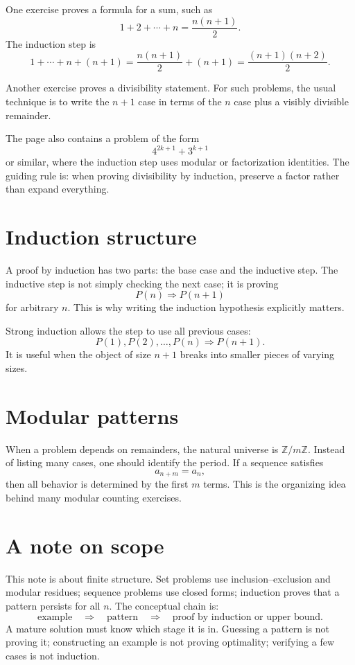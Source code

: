 One exercise proves a formula for a sum, such as
\[
  1+2+\cdots+n=\frac{n(n+1)}2.
\]
The induction step is
\[
  1+\cdots+n+(n+1)
  =\frac{n(n+1)}2+(n+1)
  =\frac{(n+1)(n+2)}2.
\]

Another exercise proves a divisibility statement.  For such problems, the usual technique is to write the \(n+1\) case in terms of the \(n\) case plus a visibly divisible remainder.

The page also contains a problem of the form
\[
  4^{2k+1}+3^{k+1}
\]
or similar, where the induction step uses modular or factorization identities.  The guiding rule is: when proving divisibility by induction, preserve a factor rather than expand everything.


\section{Induction structure}

A proof by induction has two parts: the base case and the inductive step.  The inductive step is not simply checking the next case; it is proving
\[
  P(n)\Rightarrow P(n+1)
\]
for arbitrary \(n\).  This is why writing the induction hypothesis explicitly matters.

Strong induction allows the step to use all previous cases:
\[
  P(1),P(2),\ldots,P(n)\Rightarrow P(n+1).
\]
It is useful when the object of size \(n+1\) breaks into smaller pieces of varying sizes.

\section{Modular patterns}

When a problem depends on remainders, the natural universe is \(\mathbb Z/m\mathbb Z\).  Instead of listing many cases, one should identify the period.  If a sequence satisfies
\[
  a_{n+m}=a_n,
\]
then all behavior is determined by the first \(m\) terms.  This is the organizing idea behind many modular counting exercises.

\section{A note on scope}

This note is about finite structure.  Set problems use inclusion--exclusion and modular residues; sequence problems use closed forms; induction proves that a pattern persists for all \(n\).  The conceptual chain is:
\[
  \text{example}\quad\Rightarrow\quad\text{pattern}\quad\Rightarrow\quad\text{proof by induction or upper bound}.
\]
A mature solution must know which stage it is in.  Guessing a pattern is not proving it; constructing an example is not proving optimality; verifying a few cases is not induction.

